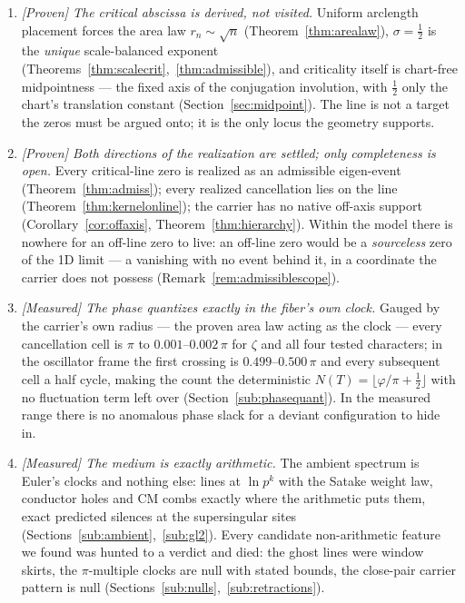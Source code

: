 \documentclass[11pt]{article}
\begin{document}
\begin{enumerate}[label=\textup{(\roman*)}]
\item \emph{[Proven] The critical abscissa is derived, not visited.}  Uniform arclength
placement forces the area law $r_n\sim\sqrt n$ (Theorem~\ref{thm:arealaw}), $\sigma=\tfrac12$
is the \emph{unique} scale-balanced exponent (Theorems~\ref{thm:scalecrit},~\ref{thm:admissible}),
and criticality itself is chart-free midpointness --- the fixed axis of the conjugation
involution, with $\tfrac12$ only the chart's translation constant (Section~\ref{sec:midpoint}).
The line is not a target the zeros must be argued onto; it is the only locus the geometry
supports.

\item \emph{[Proven] Both directions of the realization are settled; only completeness is
open.}  Every critical-line zero is realized as an admissible eigen-event
(Theorem~\ref{thm:admiss}); every realized cancellation lies on the line
(Theorem~\ref{thm:kernelonline}); the carrier has no native off-axis support
(Corollary~\ref{cor:offaxis}, Theorem~\ref{thm:hierarchy}).  Within the model there is
nowhere for an off-line zero to live: an off-line zero would be a \emph{sourceless} zero of the
1D limit --- a vanishing with no event behind it, in a coordinate the carrier does not possess
(Remark~\ref{rem:admissiblescope}).

\item \emph{[Measured] The phase quantizes exactly in the fiber's own clock.}  Gauged by the
carrier's own radius --- the proven area law acting as the clock --- every cancellation cell
is $\pi$ to $0.001$--$0.002\,\pi$ for $\zeta$ and all four tested characters; in the
oscillator frame the first crossing is $0.499$--$0.500\,\pi$ and every subsequent cell a half
cycle, making the count the deterministic $N(T)=\lfloor\varphi/\pi+\tfrac12\rfloor$ with no
fluctuation term left over (Section~\ref{sub:phasequant}).  In the measured range there is no
anomalous phase slack for a deviant configuration to hide in.

\item \emph{[Measured] The medium is exactly arithmetic.}  The ambient spectrum is Euler's
clocks and nothing else: lines at $\ln p^{k}$ with the Satake weight law, conductor holes and
CM combs exactly where the arithmetic puts them, exact predicted silences at the
supersingular sites (Sections~\ref{sub:ambient},~\ref{sub:gl2}).  Every candidate
non-arithmetic feature we found was hunted to a verdict and died: the ghost lines were window
skirts, the $\pi$-multiple clocks are null with stated bounds, the close-pair carrier pattern
is null (Sections~\ref{sub:nulls},~\ref{sub:retractions}).


\end{enumerate}
\end{document}
